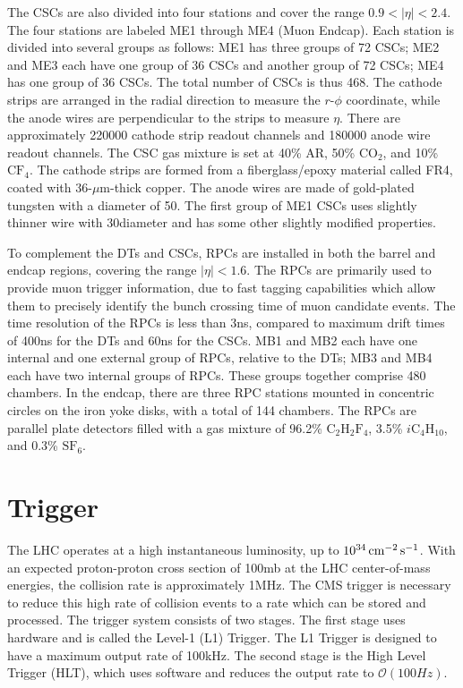 The CSCs are also divided into four stations and cover the range $0.9<|\eta|<2.4$. The four stations are labeled ME1 through ME4 (Muon Endcap). Each station is divided into several groups as follows: ME1 has three groups of 72 CSCs; ME2 and ME3 each have one group of 36 CSCs and another group of 72 CSCs; ME4 has one group of 36 CSCs. The total number of CSCs is thus 468. The cathode strips are arranged in the radial direction to measure the $r$-$\phi$ coordinate, while the anode wires are perpendicular to the strips to measure $\eta$. There are approximately 220000 cathode strip readout channels and 180000 anode wire readout channels. The CSC gas mixture is set at 40\% AR, 50\% $\text{CO}_2$, and 10\% $\text{CF}_4$. The cathode strips are formed from a fiberglass/epoxy material called FR4, coated with 36-$\mu$m-thick copper. The anode wires are made of gold-plated tungsten with a diameter of 50\mum. The first group of ME1 CSCs uses slightly thinner wire with 30\mum diameter and has some other slightly modified properties.

To complement the DTs and CSCs, RPCs are installed in both the barrel and endcap regions, covering the range $|\eta|<1.6$. The RPCs are primarily used to provide muon trigger information, due to fast tagging capabilities which allow them to precisely identify the bunch crossing time of muon candidate events. The time resolution of the RPCs is less than 3\unit{ns}, compared to maximum drift times of 400\unit{ns} for the DTs and 60\unit{ns} for the CSCs. MB1 and MB2 each have one internal and one external group of RPCs, relative to the DTs; MB3 and MB4 each have two internal groups of RPCs. These groups together comprise 480 chambers. In the endcap, there are three RPC stations mounted in concentric circles on the iron yoke disks, with a total of 144 chambers. The RPCs are parallel plate detectors filled with a gas mixture of 96.2\% $\text{C}_2\text{H}_2\text{F}_4$, 3.5\% $i\text{C}_4\text{H}_{10}$, and 0.3\% $\text{SF}_6$.


\section{Trigger}

The LHC operates at a high instantaneous luminosity, up to $10^{34}\,\text{cm}^\text{$-$2}\,\text{s}^\text{$-$1}$. With an expected proton-proton cross section of 100\unit{mb} at the LHC center-of-mass energies, the collision rate is approximately 1\unit{MHz}. The CMS trigger is necessary to reduce this high rate of collision events to a rate which can be stored and processed. The trigger system consists of two stages. The first stage uses hardware and is called the Level-1 (L1) Trigger. The L1 Trigger is designed to have a maximum output rate of 100\unit{kHz}. The second stage is the High Level Trigger (HLT), which uses software and reduces the output rate to $\mathcal{O}(100\unit{Hz})$.

